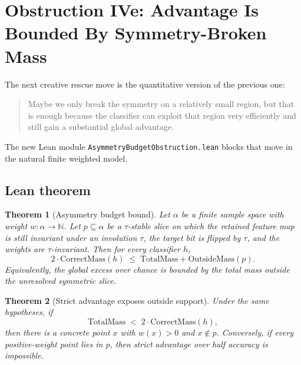 \documentclass[11pt]{article}
\newtheorem{theorem}{Theorem}[section]
\theoremstyle{remark}
\begin{document}
\section{Obstruction IVe: Advantage Is Bounded By Symmetry-Broken Mass}

The next creative rescue move is the quantitative version of the previous one:
\begin{quote}
Maybe we only break the symmetry on a relatively small region, but that is enough because the
classifier can exploit that region very efficiently and still gain a substantial global advantage.
\end{quote}

The new Lean module \texttt{AsymmetryBudgetObstruction.lean} blocks that move in the natural
finite weighted model.

\subsection{Lean theorem}

\begin{theorem}[Asymmetry budget bound]
Let \(\alpha\) be a finite sample space with weight \(w : \alpha \to \mathbb{N}\).  Let
\(p \subseteq \alpha\) be a \(\tau\)-stable slice on which the retained feature map is still
invariant under an involution \(\tau\), the target bit is flipped by \(\tau\), and the weights are
\(\tau\)-invariant.  Then for every classifier \(h\),
\[
  2 \cdot \mathrm{CorrectMass}(h)
  \;\le\;
  \mathrm{TotalMass} + \mathrm{OutsideMass}(p).
\]
Equivalently, the global excess over chance is bounded by the total mass outside the unresolved
symmetric slice.
\end{theorem}

\begin{theorem}[Strict advantage exposes outside support]
Under the same hypotheses, if
\[
  \mathrm{TotalMass}
  \;<\;
  2 \cdot \mathrm{CorrectMass}(h),
\]
then there is a concrete point \(x\) with \(w(x)>0\) and \(x\notin p\).  Conversely, if every
positive-weight point lies in \(p\), then strict advantage over half accuracy is impossible.
\end{theorem}
\end{document}
